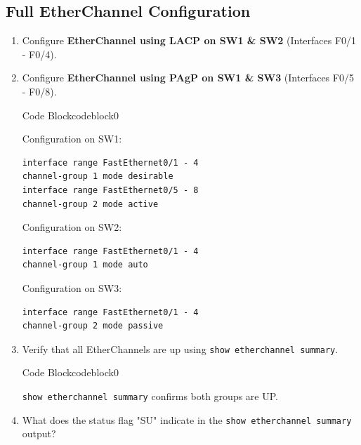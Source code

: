 \documentclass[a4paper]{article}
\begin{document}
\subsection{Full EtherChannel Configuration}
\begin{enumerate}
	\item Configure \textbf{EtherChannel using LACP on SW1 \& SW2} (Interfaces F0/1 - F0/4).
	\item Configure \textbf{EtherChannel using PAgP on SW1 \& SW3} (Interfaces F0/5 - F0/8).


	      \begin{ocg}{Code Block}{codeblock}{0}

		      \vspace{0.5cm}
		      Configuration on SW1:
		      \begin{lstlisting}
interface range FastEthernet0/1 - 4
channel-group 1 mode desirable
interface range FastEthernet0/5 - 8
channel-group 2 mode active
    \end{lstlisting}
		      Configuration on SW2:
		      \begin{lstlisting}
interface range FastEthernet0/1 - 4
channel-group 1 mode auto
    \end{lstlisting}
		      Configuration on SW3:
		      \begin{lstlisting}
interface range FastEthernet0/1 - 4
channel-group 2 mode passive
    \end{lstlisting}
		      \vspace{0.5cm}
	      \end{ocg}

	\item Verify that all EtherChannels are up using \texttt{show etherchannel summary}.

	      \begin{ocg}{Code Block}{codeblock}{0}

		      \vspace{0.5cm}
		      \begin{tcolorbox}
			      \texttt{show etherchannel summary} confirms both groups are UP.
		      \end{tcolorbox}
		      \vspace{0.5cm}
	      \end{ocg}
	\item What does the status flag "SU" indicate in the \texttt{show etherchannel summary} output?


\end{enumerate}
\end{document}
